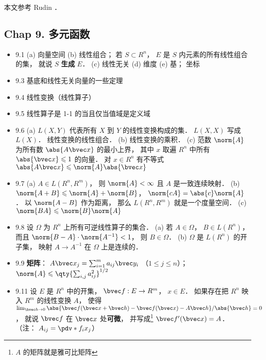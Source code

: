 
本文参考 Rudin \cite{Rudin}．

\subsection{Chap 9. 多元函数}

\begin{itemize}
\item 9.1 (a) 向量空间 (b) 线性组合； 若 $S \subset R^n$， $E$ 是 $S$ 内元素的所有线性组合的集， 就说 $S$ \textbf{生成} $E$． (c) 线性无关 (d) 维度 (e) 基； 坐标

\item 9.3 基底和线性无关向量的一些定理

\item 9.4 线性变换（线性算子）

\item 9.5 线性算子是 1-1 的当且仅当值域是定义域

\item 9.6 (a) $L(X,Y)$ 代表所有 $X$ 到 $Y$ 的线性变换构成的集． $L(X,X)$ 写成 $L(X)$． 线性变换的线性组合． (b) 线性变换的乘积． (c) 范数 $\norm{A}$ 为所有数 $\abs{A\bvec x}$ 的最小上界， 其中 $x$ 取遍 $R^n$ 中所有 $\abs{\bvec x}\leqslant 1$ 的向量． 对 $x\in R^n$ 有不等式 $\abs{A\bvec x}\leqslant \norm{A}\abs{\bvec x}$

\item 9.7 (a) $A\in L(R^n,R^m)$， 则 $\norm{A}<\infty$ 且 $A$ 是一致连续映射． (b) $\norm{A+B}\leqslant \norm{A}+\norm{B}$， $\norm{cA} = \abs{c}\norm{A}$． 以 $\norm{A-B}$ 作为距离， 那么 $L(R^n,R^m)$ 就是一个度量空间． (c) $\norm{BA} \leqslant \norm{B}\norm{A}$

\item 9.8 设 $\Omega$ 为 $R^n$ 上所有可逆线性算子的集合． (a) 若 $A\in\Omega$， $B\in L(R^n)$， 而且 $\norm{B-A}\cdot\norm{A^{-1}}<1$， 则 $B\in \Omega$． (b) $\Omega$ 是 $L(R^n)$ 的开子集， 映射 $A\to A^{-1}$ 在 $\Omega$ 上是连续的．

\item 9.9 \textbf{矩阵}： $A\bvec x_j = \sum_{i=1}^m a_{ij}\bvec y_i$ （$1\leqslant j\leqslant n$）； $\norm{A}\leqslant \qty{\sum_{i,j}a_{ij}^2}^{1/2}$

\item 9.11 设 $E$ 是 $R^n$ 中的开集， $\bvec f: E\to R^m$， $x\in E$． 如果存在把 $R^n$ 映入 $R^m$ 的线性变换 $A$， 使得 $\lim_{\bvec h\to 0} \abs{\bvec f(\bvec x+\bvec h) - \bvec f(\bvec x) - A\bvec h}/{\abs{\bvec h}} = 0$， 就说 $\bvec f$ 在 $\bvec x$ 处\textbf{可微}， 并写成\footnote{$A$ 的矩阵就是雅可比矩阵} $\bvec f'(\bvec x) = A$． （注： $A_{ij} = \pdv*{f_i}{x_j}$）


\end{itemize}
